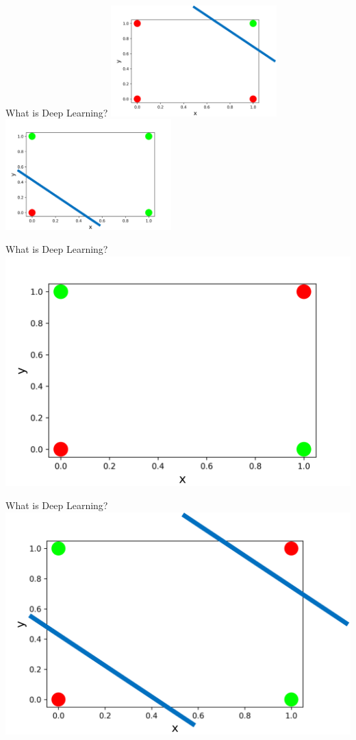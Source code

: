 \documentclass{beamer}
\begin{document}
\begin{frame}[fragile]{What is Deep Learning?}
    \includegraphics[width=0.48\textwidth,height=\textheight,keepaspectratio]{figures/And Example 2.png}
    \includegraphics[width=0.48\textwidth,height=\textheight,keepaspectratio]{figures/Or Example 2.png}
\end{frame}
\begin{frame}[fragile]{What is Deep Learning?}
    \includegraphics[width=\textwidth,height=\textheight,keepaspectratio]{figures/Xor Example.png}
\end{frame}
\begin{frame}[fragile]{What is Deep Learning?}
    \includegraphics[width=\textwidth,height=\textheight,keepaspectratio]{figures/Xor Example 2.png}
\end{frame}
\end{document}
